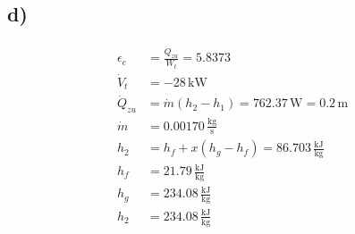 

\subsection*{d)}
\begin{align*}
\epsilon_c &= \frac{\dot{Q}_{zu}}{W_t} = 5.8373 \\
\dot{V}_t &= -28 \, \text{kW} \\
\dot{Q}_{zu} &= \dot{m} (h_2 - h_1) = 762.37 \, \text{W} = 0.2 \, \text{m} \\
\dot{m} &= 0.00170 \, \frac{\text{kg}}{\text{s}} \\
h_2 &= h_f + x(h_g - h_f) = 86.703 \, \frac{\text{kJ}}{\text{kg}} \\
h_f &= 21.79 \, \frac{\text{kJ}}{\text{kg}} \\
h_g &= 234.08 \, \frac{\text{kJ}}{\text{kg}} \\
h_2 &= 234.08 \, \frac{\text{kJ}}{\text{kg}}
\end{align*}